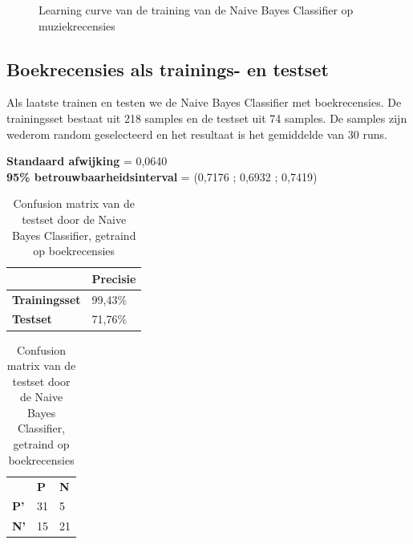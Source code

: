 \begin{figure}[h]%
    \centering
    \label{fig:lc-music-music}
    \caption{Learning curve van de training van de Naive Bayes Classifier op muziekrecensies}
\end{figure}

\subsection{Boekrecensies als trainings- en testset}\label{Boeken als trainings- en testset}

Als laatste trainen en testen we de Naive Bayes Classifier met boekrecensies. De trainingsset bestaat uit 218 samples en de testset uit 74 samples. De samples zijn wederom random geselecteerd en het resultaat is het gemiddelde van 30 runs.

\textbf{Standaard afwijking} = 0,0640\\
\textbf{95\% betrouwbaarheidsinterval} = (0,7176 ; 0,6932 ; 0,7419)\\
 
\begin{table}[h]
\centering
\setlength\tabcolsep{4pt}
\begin{minipage}{0.48\textwidth}
\centering
\begin{tabular}{l|l|}
\cline{2-2}
                                            & \textbf{Precisie} \\ \hline
\multicolumn{1}{|l|}{\textbf{Trainingsset}} & 99,43\%           \\ \hline
\multicolumn{1}{|l|}{\textbf{Testset}}      & 71,76\%           \\ \hline
\end{tabular}
\caption{Classificatieprecisie Naive Bayes Classifier, getraind op boekrecensies}
\end{minipage}%
\hfill
\begin{minipage}{0.48\textwidth}
\centering
\begin{tabular}{lll}
                                 & \textbf{P}               & \textbf{N}            \\ \cline{2-3} 
\multicolumn{1}{l|}{\textbf{P'}} & \multicolumn{1}{l|}{31} & \multicolumn{1}{l|}{5} \\ \cline{2-3} 
\multicolumn{1}{l|}{\textbf{N'}} & \multicolumn{1}{l|}{15} & \multicolumn{1}{l|}{21} \\ \cline{2-3} 
\end{tabular}
\caption{Confusion matrix van de testset door de  Naive Bayes Classifier, getraind op boekrecensies} 
\end{minipage}
\end{table}


